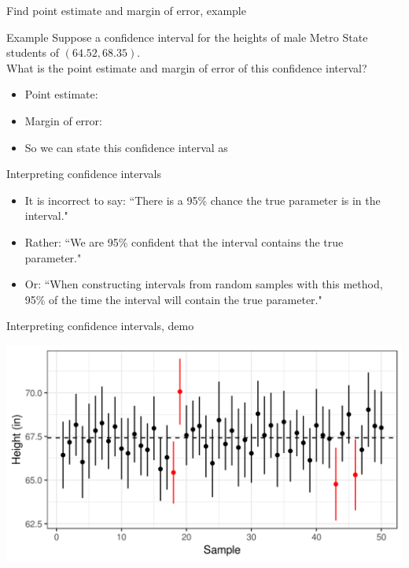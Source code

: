 \documentclass[xcolor=table, aspectratio=169, bigger]{beamer}
\begin{document}
\begin{frame}{Find point estimate and margin of error, example}
\begin{exampleblock}{Example}
Suppose a confidence interval for the heights of male Metro State students of $(64.52, 68.35)$.\\
\smallskip
 What is the point estimate and margin of error of this confidence interval?\\
\begin{itemize}
\pause\item Point estimate:\\ \smallskip
{}
\pause\item Margin of error:\\ \smallskip
{}
\pause\item So we can state this confidence interval as\\ \smallskip
{}
\end{itemize}
\end{exampleblock}

\end{frame}

\begin{frame}{Interpreting confidence intervals}

\begin{block}{}
\begin{itemize}
\item It is incorrect to say: ``There is a 95\% chance the true parameter is in the interval."
\pause\item Rather: ``We are 95\% confident that the interval contains the true parameter."
\pause\item Or: ``When constructing intervals from random samples with this method, 95\% of the time the interval will contain the true parameter."
\end{itemize}
\end{block}

\end{frame}

\begin{frame}{Interpreting confidence intervals, demo}

{\centering
\includegraphics[width=5.5in]{../images/wk07_metro_hgts_cis}
\par}
\end{frame}
\end{document}
